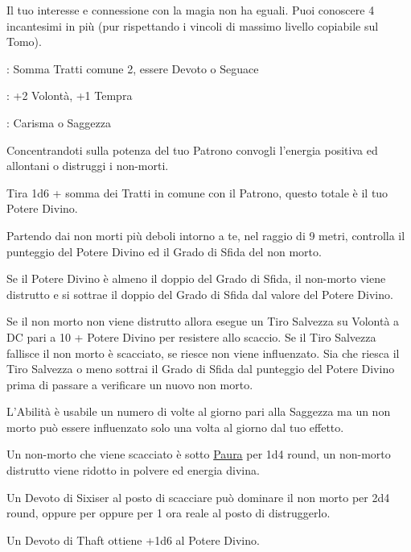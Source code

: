 \begin{multicols}{2}
Il tuo interesse e connessione con la magia non ha eguali. Puoi conoscere 4 incantesimi in più (pur rispettando i vincoli di massimo livello copiabile sul Tomo).

\begin{description}[noitemsep, topsep=0pt, parsep=0pt, partopsep=0pt, leftmargin=0cm, labelwidth=2.5cm]
    \item[\textbf{Requisito}]: Somma Tratti comune 2, essere Devoto o Seguace
    \item[\textbf{Tiri Salvezza}]: +2 Volontà, +1 Tempra
    \item[\textbf{Caratteristica}]: Carisma o Saggezza
\end{description}

Concentrandoti sulla potenza del tuo Patrono convogli l'energia positiva ed allontani o distruggi i non-morti.

Tira 1d6 + somma dei Tratti in comune con il Patrono, questo totale è il tuo Potere Divino.

Partendo dai non morti più deboli intorno a te, nel raggio di 9 metri, controlla il punteggio del Potere Divino ed il Grado di Sfida del non morto.

Se il Potere Divino è almeno il doppio del Grado di Sfida, il non-morto viene distrutto e si sottrae il doppio del Grado di Sfida dal valore del Potere Divino.

Se il non morto non viene distrutto allora esegue un Tiro Salvezza su Volontà a DC pari a 10 + Potere Divino per resistere allo scaccio. Se il Tiro Salvezza fallisce il non morto è scacciato, se riesce non viene influenzato. Sia che riesca il Tiro Salvezza o meno sottrai il Grado di Sfida dal punteggio del Potere Divino prima di passare a verificare un nuovo non morto.

L'Abilità è usabile un numero di volte al giorno pari alla Saggezza ma un non morto può essere influenzato solo una volta al giorno dal tuo effetto.

Un non-morto che viene scacciato è sotto \hyperlink{condizionepaura}{Paura} per 1d4 round, un non-morto distrutto viene ridotto in polvere ed energia divina.

Un Devoto di Sixiser al posto di scacciare può dominare il non morto per 2d4 round, oppure per oppure per 1 ora reale al posto di distruggerlo.

Un Devoto di Thaft ottiene +1d6 al Potere Divino.


\end{multicols}
